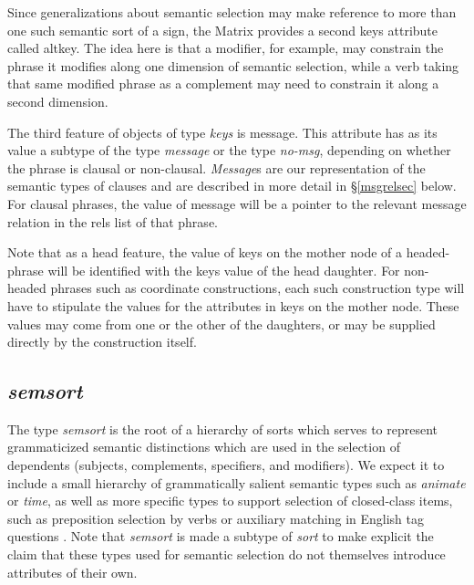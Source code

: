 \documentclass[12pt]{article}
\begin{document}
Since generalizations about semantic selection may make reference to more than
one such semantic sort of a sign, the Matrix provides a second {\sc keys}
attribute called {\sc altkey}.  The idea here is that a modifier, for example,
may constrain the phrase it modifies along one dimension of semantic selection,
while a verb taking that same modified phrase as a complement may need to 
constrain it along a second dimension.  

The third feature of objects of type {\it keys} is {\sc message}.
This attribute has as its value a subtype of the type {\it message} 
or the type {\it no-msg}, depending on whether the phrase is clausal
or non-clausal.  {\it Message}s are our representation of the 
semantic types of clauses and are described in more detail in
\S\ref{msgrelsec} below.  For clausal phrases, the value of {\sc message}
will be a pointer to the relevant message relation in the {\sc rels} list
of that phrase.  

Note that as a head feature, the value of {\sc keys} on the mother node of a
headed-phrase will be identified with the {\sc keys} value of the head 
daughter.  For non-headed phrases such as coordinate constructions, each
such construction type will have to stipulate the values for the attributes
in {\sc keys} on the mother node.  These values may come from one or the other
of the daughters, or may be supplied directly by the construction itself.




\subsection{{\it semsort}}
\label{semsort}

The type {\it semsort} is the root of a hierarchy of sorts which
serves to represent grammaticized semantic distinctions which are used
in the selection of dependents (subjects, complements, specifiers, and
modifiers).  We expect it to include a small hierarchy of
grammatically salient semantic types such as {\it animate} or {\it
time}, as well as more specific types to support selection of
closed-class items, such as preposition selection by verbs or
auxiliary matching in English tag questions \cite{Ben:Fli:99}.  Note
that {\it semsort} is made a subtype of {\it sort} to make explicit
the claim that these types used for semantic selection do not
themselves introduce attributes of their own.
\end{document}
